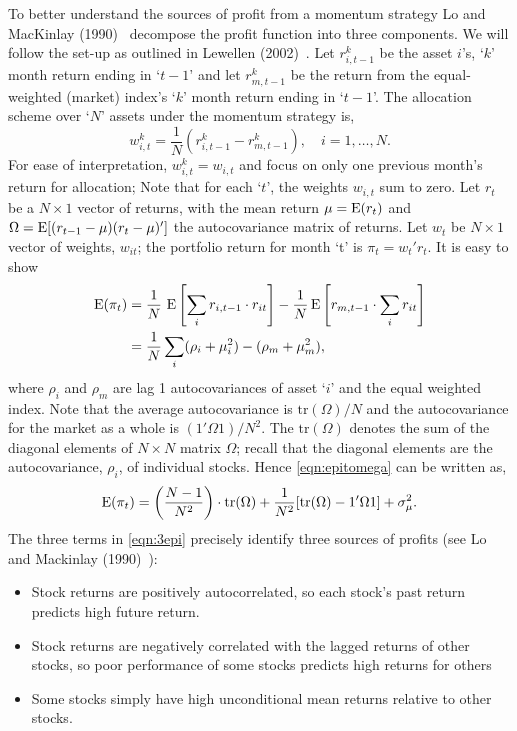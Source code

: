 To better understand the sources of profit from a momentum strategy Lo and MacKinlay (1990)~\cite{lo1990} decompose the profit function into three components. We will follow the set-up as outlined in Lewellen (2002)~\cite{lew2002}. Let $r_{i,t-1}^k$ be the asset $i$'s, `$k$' month return ending in `$t-1$' and let $r_{m,t-1}^k$ be the return from the equal-weighted (market) index's `$k$' month return ending in `$t-1$'. The allocation scheme over `$N$' assets under the momentum strategy is,
	\begin{equation} \label{eqn:witkrdiff}
	w_{i,t}^k= \frac{1}{N} (r_{i,t-1}^k - r_{m,t-1}^k), \quad i= 1,\ldots, N.
	\end{equation}
For ease of interpretation, $w_{i,t}^k = w_{i,t}$ and focus on only one previous month's return for allocation; Note that for each `$t$', the weights $w_{i,t}$ sum to zero. Let $r_t$ be a $N \times 1$ vector of returns, with the mean return $\mu = \operatorname{E}(r_t)$ and $\Omega = \operatorname{E}[(r_{t-1} - \mu)(r_t - \mu)']$ the autocovariance matrix of returns. Let $w_t$ be $N \times 1$ vector of weights, $w_{it}$; the portfolio return for month `t' is $\pi_t = w_t'r_t$. It is easy to show
	\begin{equation} \label{eqn:epitomega}
	\begin{aligned}
	\Ex(\pi_t)&= \frac{1}{N}\, \Ex\left[\sum_i r_{i,t-1} \cdot r_{it} \right] - \frac{1}{N} \Ex\left[r_{m,t-1} \cdot \sum_i r_{it} \right] \\
	&= \frac{1}{N}\sum_i (\rho_i + \mu_i^2) - (\rho_m + \mu_m^2),
	\end{aligned}
	\end{equation}
where $\rho_i$ and $\rho_m$ are lag 1 autocovariances of asset `$i$' and the equal weighted index. Note that the average autocovariance is $\text{tr}(\Omega)/N$ and the autocovariance for the market as a whole is $(1' \Omega 1)/N^2$. The $\text{tr}(\Omega)$ denotes the sum of the diagonal elements of $N \times N$ matrix $\Omega$; recall that the diagonal elements are the autocovariance, $\rho_i$, of individual stocks. Hence \eqref{eqn:epitomega} can be written as,
	\begin{equation} \label{eqn:3epi}
	\Ex(\pi_t) = \left(\frac{N-1}{N^2}\right)\cdot \text{tr}(\Omega) + \frac{1}{N^2} [\text{tr}(\Omega) - 1' \Omega 1] + \sigma_{\mu}^2.
	\end{equation}
The three terms in \eqref{eqn:3epi} precisely identify three sources of profits (see Lo and Mackinlay (1990)~\cite{lo1990}):


\begin{itemize}
\item Stock returns are positively autocorrelated, so each stock's past return predicts high future return.
\item Stock returns are negatively correlated with the lagged returns of other stocks, so poor performance of some stocks predicts high returns for others
\item Some stocks simply have high unconditional mean returns relative to other stocks.
\end{itemize}


